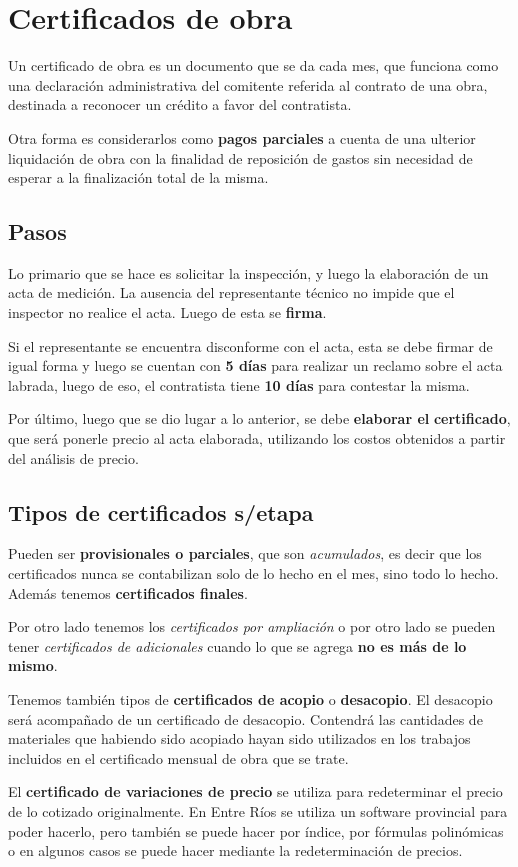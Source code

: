 \documentclass[../main.tex]{subfiles}
\begin{document}
\section{Certificados de obra}

Un certificado de obra es un documento que se da cada mes, que funciona como una
declaración administrativa del comitente referida al contrato de una obra,
destinada a reconocer un crédito a favor del contratista. 

Otra forma es considerarlos como \textbf{pagos parciales} a cuenta de una
ulterior liquidación de obra con la finalidad de reposición de gastos sin
necesidad de esperar a la finalización total de la misma.

\subsection{Pasos}

Lo primario que se hace es solicitar la inspección, y luego la elaboración de
un acta de medición. La ausencia del representante técnico no impide que el
inspector no realice el acta. Luego de esta se \textbf{firma}.

Si el representante se encuentra disconforme con el acta, esta se debe firmar 
de igual forma y luego se cuentan con \textbf{5 días} para realizar un reclamo
sobre el acta labrada, luego de eso, el contratista tiene \textbf{10 días} para
contestar la misma.

Por último, luego que se dio lugar a lo anterior, se debe \textbf{elaborar el} 
\textbf{certificado}, que será ponerle precio al acta elaborada, utilizando los
costos obtenidos a partir del análisis de precio.

\subsection{Tipos de certificados s/etapa}

Pueden ser \textbf{provisionales o parciales}, que son \textit{acumulados}, es
decir que los certificados nunca se contabilizan solo de lo hecho en el mes,
sino todo lo hecho. Además tenemos \textbf{certificados finales}.

Por otro lado tenemos los \textit{certificados por ampliación} o por otro lado
se pueden tener \textit{certificados de adicionales} cuando lo que se agrega
\textbf{no es más de lo mismo}.

Tenemos también tipos de \textbf{certificados de acopio} o \textbf{desacopio}.
El desacopio será acompañado de un certificado de desacopio. Contendrá las
cantidades de materiales que habiendo sido acopiado hayan sido utilizados en
los trabajos incluidos en el certificado mensual de obra que se trate.

El \textbf{certificado de variaciones de precio} se utiliza para redeterminar
el precio de lo cotizado originalmente. En Entre Ríos se utiliza un software
provincial para poder hacerlo, pero también se puede hacer por índice, por
fórmulas polinómicas o en algunos casos se puede hacer mediante la
redeterminación de precios.
\end{document}
